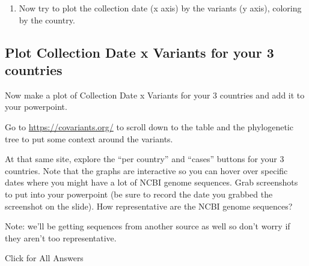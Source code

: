 \documentclass[
]{book}
\providecommand{\tightlist}{%
  \setlength{\itemsep}{0pt}\setlength{\parskip}{0pt}}
\begin{document}
\begin{enumerate}
\def\labelenumi{\arabic{enumi}.}
\setcounter{enumi}{15}
\tightlist
\item
  Now try to plot the collection date (x axis) by the variants (y axis), coloring by the country.
\end{enumerate}

\hypertarget{plot-collection-date-x-variants-for-your-3-countries}{%
\subsection{Plot Collection Date x Variants for your 3 countries}\label{plot-collection-date-x-variants-for-your-3-countries}}

Now make a plot of Collection Date x Variants for your 3 countries and add it to your powerpoint.

Go to \url{https://covariants.org/} to scroll down to the table and the phylogenetic tree to put some context around the variants.

At that same site, explore the ``per country'' and ``cases'' buttons for your 3 countries. Note that the graphs are interactive so you can hover over specific dates where you might have a lot of NCBI genome sequences. Grab screenshots to put into your powerpoint (be sure to record the date you grabbed the screenshot on the slide). How representative are the NCBI genome sequences?

Note: we'll be getting sequences from another source as well so don't worry if they aren't too representative.

Click for All Answers
\end{document}
